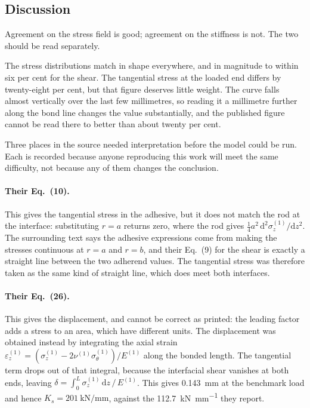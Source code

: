 \subsection{Discussion}
\label{sec:hassdiscussion}
 
Agreement on the stress field is good; agreement on the stiffness is not. The
two should be read separately.
 
The stress distributions match in shape everywhere, and in magnitude to within
six per cent for the shear. The tangential stress at the loaded end differs by
twenty-eight per cent, but that figure deserves little weight. The curve falls
almost vertically over the last few millimetres, so reading it a millimetre
further along the bond line changes the value substantially, and the published
figure cannot be read there to better than about twenty per cent.
 
Three places in the source needed interpretation before the model could be
run. Each is recorded because anyone reproducing this work will meet the same
difficulty, not because any of them changes the conclusion.
 
\paragraph{Their Eq.~(10).} This gives the tangential stress in the adhesive,
but it does not match the rod at the interface: substituting $r = a$ returns
zero, where the rod gives
$\tfrac{1}{4}a^2\,\mathrm{d}^2\sigma_z^{(1)}/\mathrm{d}z^2$. The surrounding
text says the adhesive expressions come from making the stresses continuous
at $r = a$ and $r = b$, and their Eq.~(9) for the shear is exactly a straight
line between the two adherend values. The tangential stress was therefore
taken as the same kind of straight line, which does meet both interfaces.
 
\paragraph{Their Eq.~(26).} This gives the displacement, and cannot be correct
as printed: the leading factor adds a stress to an area, which have different
units. The displacement was obtained instead by integrating the axial strain
$\varepsilon_z^{(1)} = (\sigma_z^{(1)} - 2\nu^{(1)}\sigma_\theta^{(1)})/E^{(1)}$
along the bonded length. The tangential term drops out of that integral,
because the interfacial shear vanishes at both ends, leaving
$\delta = \int_0^L \sigma_z^{(1)}\,\mathrm{d}z\,/\,E^{(1)}$. This gives
\SI{0.143}{\milli\metre} at the benchmark load and hence
$K_s = \SI{201}{\kilo\newton\per\milli\metre}$, against the
\SI{112.7}{\kilo\newton\per\milli\metre} they report.
 

